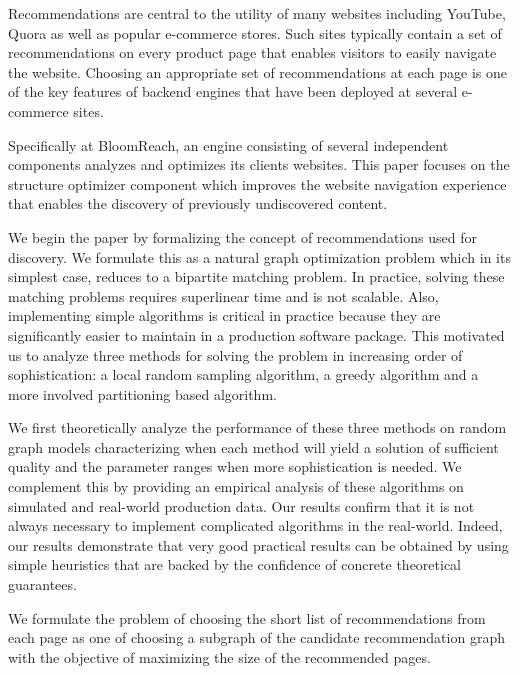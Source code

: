 \abstract

Recommendations are central to the utility of many websites including
YouTube, Quora as well as popular e-commerce stores. Such sites
typically contain a set of recommendations on every product page that 
enables visitors to easily navigate the website. Choosing an
appropriate set of recommendations at each page is one of the key 
features of backend engines that have been deployed at several e-commerce sites.

Specifically at BloomReach, an engine consisting of several
independent components analyzes and optimizes its clients
websites. This paper focuses on the structure optimizer component
which improves the website navigation experience that enables the discovery of previously
undiscovered content.

We begin the paper by formalizing the concept of recommendations used
for discovery. We formulate this as a natural graph optimization
problem which in its simplest case, reduces to a bipartite matching
problem. In practice, solving these matching problems requires
superlinear time and is not scalable. Also, implementing simple
algorithms is critical in practice because they are significantly
easier to maintain in a production software package. This motivated us
to analyze three methods for solving the problem in increasing order of sophistication: 
a local random sampling algorithm, a greedy algorithm and a more involved partitioning based algorithm.

We first theoretically analyze the performance of these three methods
on random graph models characterizing when each method will yield a
solution of sufficient quality and the parameter ranges when more 
sophistication is needed. We complement this by providing an empirical
analysis of these algorithms on simulated and real-world production
data. Our results confirm that it is not always necessary to implement
complicated algorithms in the real-world. Indeed, our results
demonstrate that very good practical results can be obtained by 
using simple heuristics that are backed by the confidence of concrete theoretical guarantees.






\iffalse

We formulate the problem of choosing the short list of recommendations from each page as one of choosing a subgraph of the candidate recommendation graph with the objective of maximizing the size of the recommended pages.

